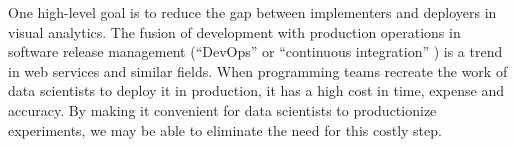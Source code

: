 One high-level goal is to reduce the gap between implementers and
deployers in visual analytics. The fusion of development with
production operations in software release management (``DevOps''
\cite{Httermann:2012:DD} or ``continuous integration''
\cite{Fowler:2006:Continuous}) is a trend in web services and similar
fields.
When programming teams recreate the work of data scientists to
deploy it in production, it has a high cost in time, expense and
accuracy. By making it convenient for data scientists to productionize
experiments, we may be able to eliminate the need for this costly step.



